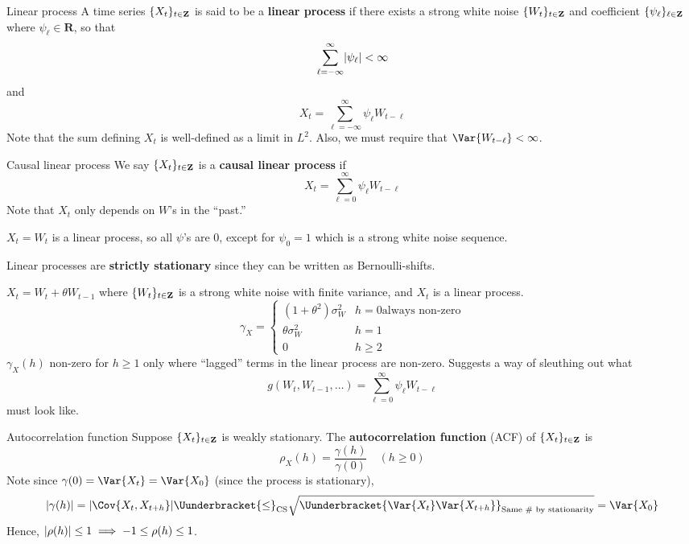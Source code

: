 \begin{Definition}{Linear process}{}
    A time series $ \{X_t\}_{t\in\mathbf{Z}} $ is said to be a
    \textbf{linear process} if there exists a strong
    white noise $ \{W_t\}_{t\in\mathbf{Z}} $ and coefficient
    $ \{\psi_\ell\}_{\ell\in\mathbf{Z}} $
    where $ \psi_\ell\in\mathbf{R} $, so that
    \[ \sum_{\ell=-\infty}^{\infty} \lvert\psi_\ell\rvert<\infty \]
    and
    \[ X_t=\sum_{\ell=-\infty}^{\infty} \psi_\ell W_{t-\ell} \]
    Note that the sum defining $ X_t $ is well-defined
    as a limit in $ L^2 $. Also, we
    must require that $ \Var{W_{t-\ell}}<\infty $.
\end{Definition}
\begin{Definition}{Causal linear process}{}
    We say $ \{X_t\}_{t\in\mathbf{Z}} $ is a \textbf{causal
        linear process} if
    \[ X_t=\sum_{\ell=0}^{\infty} \psi_\ell W_{t-\ell} \]
    Note that $ X_t $ only depends on $ W $'s in the ``past.''
\end{Definition}
\begin{Example}{}{}
    $ X_t=W_t $ is a linear process, so all
    $ \psi $'s are $ 0 $, except for $ \psi_0=1 $
    which is a strong white noise sequence.
\end{Example}
\begin{Remark}{}{}
    Linear processes are \textbf{strictly stationary} since they
    can be written as Bernoulli-shifts.
\end{Remark}
\begin{Example}{}{}
    $ X_t=W_t+\theta W_{t-1} $ where $ \{W_t\}_{t\in\mathbf{Z}} $ is a strong white noise
    with finite variance, and $ X_t $ is a linear process.
    \[ \gamma_X=\begin{cases}
            (1+\theta^2)\sigma_W^2 & h=0     \text{always non-zero} \\
            \theta\sigma_W^2       & h=1                            \\
            0                      & h\ge 2
        \end{cases} \]
    $ \gamma_X(h) $ non-zero for $ h\ge 1 $
    only where ``lagged'' terms in the linear process
    are non-zero. Suggests a way of sleuthing out what
    \[ g(W_t,W_{t-1},\ldots)=\sum_{\ell=0}^{\infty} \psi_\ell W_{t-\ell} \]
    must look like.
\end{Example}
\begin{Definition}{Autocorrelation function}{}
    Suppose $ \{X_t\}_{t\in\mathbf{Z}} $ is weakly stationary. The
    \textbf{autocorrelation function} (ACF) of $ \{X_t\}_{t\in\mathbf{Z}} $
    is
    \[ \rho_X(h)=\frac{\gamma(h)}{\gamma(0)} \quad (h\ge 0) \]
    Note since $ \gamma(0)=\Var{X_t}=\Var{X_0} $ (since the process is stationary),
    \[ \abs{\gamma(h)}=\abs{\Cov{X_t,X_{t+h}}}\Uunderbracket{\le}_{\text{CS}}
        \sqrt{\Uunderbracket{\Var{X_t}\Var{X_{t+h}}}_{\text{Same \# by stationarity}}}=\Var{X_0} \]
    Hence, $ \lvert\rho(h)\rvert\le 1\implies -1\le \rho(h)\le 1 $.
\end{Definition}
